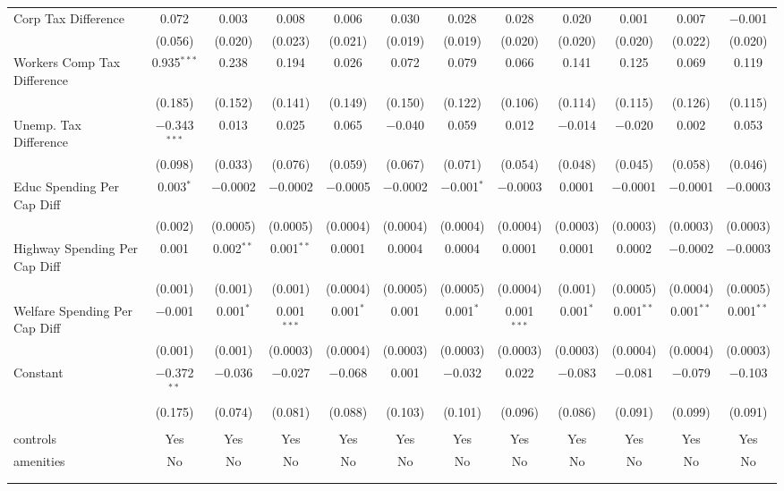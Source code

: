 \begin{table}[!htbp]
\begin{tabular}{@{\extracolsep{5pt}}lccccccccccc}
  Corp Tax Difference & 0.072 & 0.003 & 0.008 & 0.006 & 0.030 & 0.028 & 0.028 & 0.020 & 0.001 & 0.007 & $-$0.001 \\ 
  & (0.056) & (0.020) & (0.023) & (0.021) & (0.019) & (0.019) & (0.020) & (0.020) & (0.020) & (0.022) & (0.020) \\ 
  Workers Comp Tax Difference & 0.935$^{***}$ & 0.238 & 0.194 & 0.026 & 0.072 & 0.079 & 0.066 & 0.141 & 0.125 & 0.069 & 0.119 \\ 
  & (0.185) & (0.152) & (0.141) & (0.149) & (0.150) & (0.122) & (0.106) & (0.114) & (0.115) & (0.126) & (0.115) \\ 
  Unemp. Tax Difference & $-$0.343$^{***}$ & 0.013 & 0.025 & 0.065 & $-$0.040 & 0.059 & 0.012 & $-$0.014 & $-$0.020 & 0.002 & 0.053 \\ 
  & (0.098) & (0.033) & (0.076) & (0.059) & (0.067) & (0.071) & (0.054) & (0.048) & (0.045) & (0.058) & (0.046) \\ 
  Educ Spending Per Cap Diff & 0.003$^{*}$ & $-$0.0002 & $-$0.0002 & $-$0.0005 & $-$0.0002 & $-$0.001$^{*}$ & $-$0.0003 & 0.0001 & $-$0.0001 & $-$0.0001 & $-$0.0003 \\ 
  & (0.002) & (0.0005) & (0.0005) & (0.0004) & (0.0004) & (0.0004) & (0.0004) & (0.0003) & (0.0003) & (0.0003) & (0.0003) \\ 
  Highway Spending Per Cap Diff & 0.001 & 0.002$^{**}$ & 0.001$^{**}$ & 0.0001 & 0.0004 & 0.0004 & 0.0001 & 0.0001 & 0.0002 & $-$0.0002 & $-$0.0003 \\ 
  & (0.001) & (0.001) & (0.001) & (0.0004) & (0.0005) & (0.0005) & (0.0004) & (0.001) & (0.0005) & (0.0004) & (0.0005) \\ 
  Welfare Spending Per Cap Diff & $-$0.001 & 0.001$^{*}$ & 0.001$^{***}$ & 0.001$^{*}$ & 0.001 & 0.001$^{*}$ & 0.001$^{***}$ & 0.001$^{*}$ & 0.001$^{**}$ & 0.001$^{**}$ & 0.001$^{**}$ \\ 
  & (0.001) & (0.001) & (0.0003) & (0.0004) & (0.0003) & (0.0003) & (0.0003) & (0.0003) & (0.0004) & (0.0004) & (0.0003) \\ 
  Constant & $-$0.372$^{**}$ & $-$0.036 & $-$0.027 & $-$0.068 & 0.001 & $-$0.032 & 0.022 & $-$0.083 & $-$0.081 & $-$0.079 & $-$0.103 \\ 
  & (0.175) & (0.074) & (0.081) & (0.088) & (0.103) & (0.101) & (0.096) & (0.086) & (0.091) & (0.099) & (0.091) \\ 
 \hline \\[-1.8ex] 
controls & Yes & Yes & Yes & Yes & Yes & Yes & Yes & Yes & Yes & Yes & Yes \\ 
amenities & No & No & No & No & No & No & No & No & No & No & No \\ 
\hline \\[-1.8ex] 
\hline 
\hline \\[-1.8ex] 
\end{tabular} 
\end{table} 

